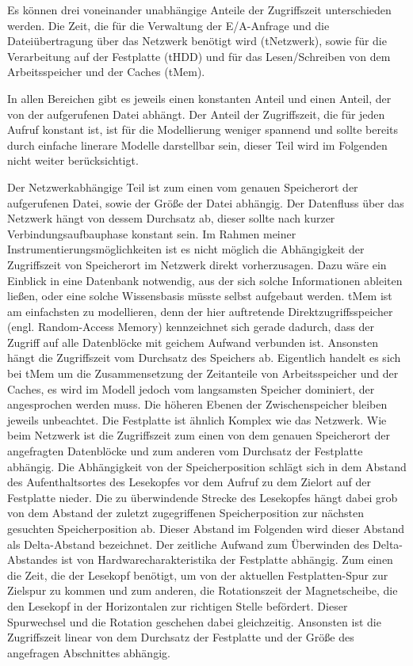 \documentclass[
	12pt,
	a4paper,
	BCOR10mm,
	DIV14,
	listof=totoc,
	bibliography=totoc,
	headsepline
]{scrreprt}
\begin{document}
Es können drei voneinander unabhängige Anteile der Zugriffszeit unterschieden werden. Die Zeit, die für die Verwaltung der E/A-Anfrage und die Dateiübertragung über das Netzwerk benötigt wird (tNetzwerk), sowie für die Verarbeitung auf der Festplatte (tHDD) und für das Lesen/Schreiben von dem Arbeitsspeicher und der Caches (tMem).

In allen Bereichen gibt es jeweils einen konstanten Anteil und einen Anteil, der von der aufgerufenen Datei abhängt. 
Der Anteil der Zugriffszeit, die für jeden Aufruf konstant ist, ist für die Modellierung weniger spannend und sollte bereits durch einfache linerare Modelle darstellbar sein, dieser Teil wird im Folgenden nicht weiter berücksichtigt.

Der Netzwerkabhängige Teil ist zum einen vom genauen Speicherort der aufgerufenen Datei, sowie der Größe der Datei abhängig. Der Datenfluss über das Netzwerk hängt von dessem Durchsatz ab, dieser sollte nach kurzer Verbindungsaufbauphase konstant sein. Im Rahmen meiner Instrumentierungsmöglichkeiten ist es nicht möglich die Abhängigkeit der Zugriffszeit von Speicherort im Netzwerk direkt vorherzusagen. Dazu wäre ein Einblick in eine Datenbank notwendig, aus der sich solche Informationen ableiten ließen, oder eine solche Wissensbasis müsste selbst aufgebaut werden.
tMem ist am einfachsten zu modellieren, denn der hier auftretende Direktzugriffsspeicher (engl. Random-Access Memory) kennzeichnet sich gerade dadurch, dass der Zugriff auf alle Datenblöcke mit geichem Aufwand verbunden ist.
Ansonsten hängt die Zugriffszeit vom Durchsatz des Speichers ab.
Eigentlich handelt es sich bei tMem um die Zusammensetzung der Zeitanteile von Arbeitsspeicher und der Caches, es wird im Modell jedoch vom langsamsten Speicher dominiert, der angesprochen werden muss. Die höheren Ebenen der Zwischenspeicher bleiben jeweils unbeachtet.
Die Festplatte ist ähnlich Komplex wie das Netzwerk. Wie beim Netzwerk ist die Zugriffszeit zum einen von dem genauen Speicherort der angefragten Datenblöcke und zum anderen vom Durchsatz der Festplatte abhängig.
Die Abhängigkeit von der Speicherposition schlägt sich in dem Abstand des Aufenthaltsortes des Lesekopfes vor dem Aufruf zu dem Zielort auf der Festplatte nieder. Die zu überwindende Strecke des Lesekopfes hängt dabei grob von dem Abstand der zuletzt zugegriffenen Speicherposition zur nächsten gesuchten Speicherposition ab. Dieser Abstand im Folgenden wird dieser Abstand als Delta-Abstand bezeichnet.
Der zeitliche Aufwand zum Überwinden des Delta-Abstandes ist von Hardwarecharakteristika der Festplatte abhängig. Zum einen die Zeit, die der Lesekopf benötigt, um von der aktuellen Festplatten-Spur zur Zielspur zu kommen und zum anderen, die Rotationszeit der Magnetscheibe, die den Lesekopf in der Horizontalen zur richtigen Stelle befördert. 
Dieser Spurwechsel und die Rotation geschehen dabei gleichzeitig. Ansonsten ist die Zugriffszeit linear von dem Durchsatz der Festplatte und der Größe des angefragen Abschnittes abhängig.
\end{document}
